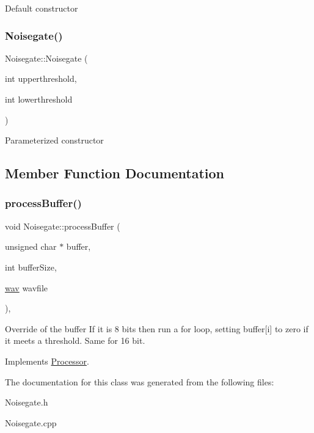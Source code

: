 Default constructor \mbox{\label{classNoisegate_a71c4785fc5ab3b3fafc258efd12465b3}} 
\subsubsection{\texorpdfstring{Noisegate()}{Noisegate()}\hspace{0.1cm}{\footnotesize\ttfamily [2/2]}}
{\footnotesize\ttfamily Noisegate\+::\+Noisegate (\begin{DoxyParamCaption}\item[{int}]{upperthreshold,  }\item[{int}]{lowerthreshold }\end{DoxyParamCaption})}

Parameterized constructor 

\subsection{Member Function Documentation}
\mbox{\label{classNoisegate_ad379f3e2ec1b28788dbf65f4f9a4427c}} 
\subsubsection{\texorpdfstring{process\+Buffer()}{processBuffer()}}
{\footnotesize\ttfamily void Noisegate\+::process\+Buffer (\begin{DoxyParamCaption}\item[{unsigned char $\ast$}]{buffer,  }\item[{int}]{buffer\+Size,  }\item[{\hyperlink{classwav}{wav}}]{wavfile }\end{DoxyParamCaption})\hspace{0.3cm}{\ttfamily [override]}, {\ttfamily [virtual]}}

Override of the buffer If it is 8 bits then run a for loop, setting buffer\mbox{[}i\mbox{]} to zero if it meets a threshold. Same for 16 bit.

Implements \hyperlink{classProcessor_ad81c2b75979636bcee7f5182cdb79a86}{Processor}.



The documentation for this class was generated from the following files\+:\begin{DoxyCompactItemize}
\item 
Noisegate.\+h\item 
Noisegate.\+cpp\end{DoxyCompactItemize}
